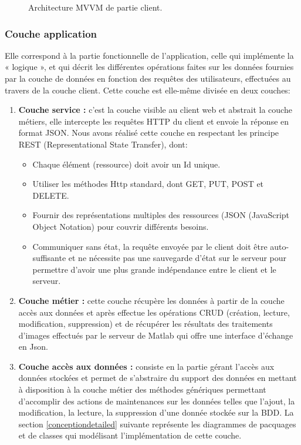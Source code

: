 \begin{figure}[H]
	\centering
	\caption{Architecture MVVM de partie client.}
	\label{clientside}
\end{figure}

\subsubsection{Couche application}
Elle correspond à la partie fonctionnelle de l'application, celle qui implémente la « logique », et qui décrit les différentes opérations faites sur les données fournies par la couche de données en fonction des requêtes des utilisateurs, effectuées au travers de la couche client. Cette couche est elle-même divisée en deux couches:  
\begin{enumerate}
	\item \textbf{Couche service :} c'est la couche visible au client web et abstrait la couche métiers, elle intercepte les requêtes HTTP du client et envoie la réponse en format JSON. Nous avons réalisé cette couche en respectant les principe REST (Representational State Transfer), dont:
	\begin{itemize}
		\item	Chaque élément (ressource) doit avoir un Id unique.
		\item	Utiliser les méthodes Http standard, dont GET, PUT, POST et DELETE.
		\item	Fournir des représentations multiples des ressources (JSON (JavaScript Object Notation) pour couvrir différents besoins. 
		\item	Communiquer sans état, la requête envoyée par le client doit être auto-suffisante et ne nécessite pas une sauvegarde d’état sur le serveur pour permettre d'avoir une plus grande indépendance entre le client et le serveur. 
	\end{itemize}
	\item \textbf{Couche métier :} cette couche récupère les données à partir de la couche accès aux données et après effectue les opérations CRUD (création, lecture, modification, suppression) et de récupérer les résultats des traitements d’images effectués par le serveur de Matlab qui offre une interface d’échange en Json.
	\item 
\textbf{Couche accès aux données : }consiste en la partie gérant l'accès aux données stockées et permet de s’abstraire du support des données en mettant à disposition à la couche métier des méthodes génériques permettant d’accomplir des actions de maintenances sur les données telles que l’ajout, la modification, la  lecture, la suppression d’une donnée stockée sur la BDD.
	La section \ref{conceptiondetailed} suivante représente les diagrammes de pacquages et de classes qui modélisant l'implémentation de cette couche.
\end{enumerate}
